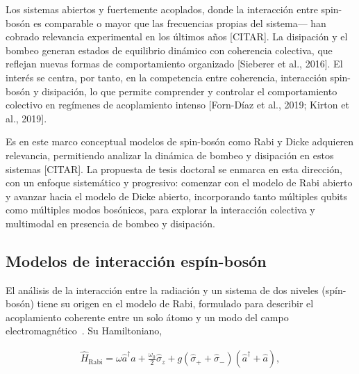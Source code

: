 \documentclass[onecolumn,notitlepage,letterpaper,aps,pra,12pt]{article}
\numberwithin{equation}{section}
\begin{document}
Los sistemas abiertos y fuertemente acoplados, donde la interacción entre spin-bosón es comparable o mayor que las frecuencias propias del sistema— han cobrado relevancia experimental en los últimos años [CITAR]. La disipación y el bombeo generan estados de equilibrio dinámico con coherencia colectiva, que reflejan nuevas formas de comportamiento organizado [Sieberer et al., 2016]. El interés se centra, por tanto, en la competencia entre coherencia, interacción spin-bosón y disipación, lo que permite comprender y controlar el comportamiento colectivo en regímenes de acoplamiento intenso [Forn-Díaz et al., 2019; Kirton et al., 2019].

Es en este marco conceptual modelos de spin-bosón como Rabi y Dicke adquieren relevancia, permitiendo analizar la dinámica de bombeo y disipación en estos sistemas [CITAR]. La propuesta de tesis doctoral se enmarca en esta dirección, con un enfoque sistemático y progresivo: comenzar con el modelo de Rabi abierto y avanzar hacia el modelo de Dicke abierto, incorporando tanto múltiples qubits como múltiples modos bosónicos, para explorar la interacción colectiva y multimodal en presencia de bombeo y disipación.




\subsection{Modelos de interacción espín-bosón}

El análisis de la interacción entre la radiación y un sistema de dos niveles (spín-bosón) tiene su origen en el modelo de Rabi, formulado para describir el acoplamiento coherente entre un solo átomo y un modo del campo electromagnético~\cite{rabi1936}. Su Hamiltoniano,

\begin{gather}
    \hat{H}_{\text{Rabi}} = \omega\hat{a}^{\dagger}\hat{a} + \frac{\omega_{0}}{2}\hat{\sigma}_{z} + g\left( \hat{\sigma}_{+} + \hat{\sigma}_{-} \right)\left( \hat{a}^{\dagger} + \hat{a} \right),
\end{gather}
\end{document}
